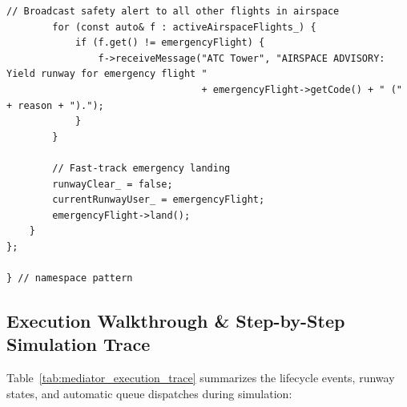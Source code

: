 \documentclass[12pt,a4paper]{article}
\begin{document}
\begin{lstlisting}[caption={Concrete Mediator: Central ATCTower Engine}]
        // Broadcast safety alert to all other flights in airspace
        for (const auto& f : activeAirspaceFlights_) {
            if (f.get() != emergencyFlight) {
                f->receiveMessage("ATC Tower", "AIRSPACE ADVISORY: Yield runway for emergency flight " 
                                  + emergencyFlight->getCode() + " (" + reason + ").");
            }
        }

        // Fast-track emergency landing
        runwayClear_ = false;
        currentRunwayUser_ = emergencyFlight;
        emergencyFlight->land();
    }
};

} // namespace pattern
\end{lstlisting}

\newpage
\subsection{Execution Walkthrough \& Step-by-Step Simulation Trace}

Table~\ref{tab:mediator_execution_trace} summarizes the lifecycle events, runway states, and automatic queue dispatches during simulation:
\end{document}

